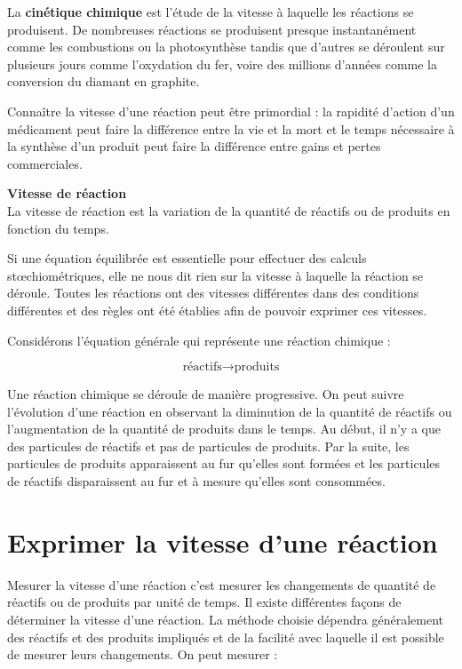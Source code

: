 \documentclass[
  11pt,
  a4paper,
  openany]{book}
\begin{document}
La \textbf{cinétique chimique} est l'étude de la vitesse à laquelle les réactions se produisent. De nombreuses réactions se produisent presque instantanément comme les combustions ou la photosynthèse tandis que d'autres se déroulent sur plusieurs jours comme l'oxydation du fer, voire des millions d'années comme la conversion du diamant en graphite.

Connaître la vitesse d'une réaction peut être primordial : la rapidité d'action d'un médicament peut faire la différence entre la vie et la mort et le temps nécessaire à la synthèse d'un produit peut faire la différence entre gains et pertes commerciales.

\begin{tcolorbox}
\textbf{Vitesse de réaction}\\
La vitesse de réaction est la variation de la quantité de réactifs ou de produits en fonction du temps.

\end{tcolorbox}

Si une équation équilibrée est essentielle pour effectuer des calculs stœchiométriques, elle ne nous dit rien sur la vitesse à laquelle la réaction se déroule. Toutes les réactions ont des vitesses différentes dans des conditions différentes et des règles ont été établies afin de pouvoir exprimer ces vitesses.

Considérons l'équation générale qui représente une réaction chimique :

\[
\text{réactifs} \rightarrow \text{produits}
\]

Une réaction chimique se déroule de manière progressive. On peut suivre l'évolution d'une réaction en observant la diminution de la quantité de réactifs ou l'augmentation de la quantité de produits dans le temps. Au début, il n'y a que des particules de réactifs et pas de particules de produits. Par la suite, les particules de produits apparaissent au fur qu'elles sont formées et les particules de réactifs disparaissent au fur et à mesure qu'elles sont consommées.

\hypertarget{exprimer-la-vitesse-dune-ruxe9action}{%
\section{Exprimer la vitesse d'une réaction}\label{exprimer-la-vitesse-dune-ruxe9action}}

Mesurer la vitesse d'une réaction c'est mesurer les changements de quantité de réactifs ou de produits par unité de temps. Il existe différentes façons de déterminer la vitesse d'une réaction. La méthode choisie dépendra généralement des réactifs et des produits impliqués et de la facilité avec laquelle il est possible de mesurer leurs changements. On peut mesurer :
\end{document}
